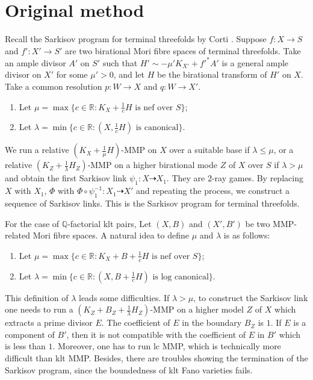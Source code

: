 \documentclass[11pt]{amsart}
\begin{document}
\section{Original method}
Recall the Sarkisov program for terminal threefolds by Corti \cite{cortiFactoringBirationalMaps}. Suppose $f: X\to S$ and $f':X'\to S'$ are two birational Mori fibre spaces of terminal threefolds.
Take an ample divisor $A'$ on $S'$ such that $H'\sim -\mu'K_{X'}+f'^*A'$  is a general ample divisor on $X'$ for some $\mu'>0$, and let $H$ be the birational transform of $H'$ on $X$. Take a common resolution $p: W\to X$ and $q:W \to X'$. 
\begin{enumerate}
  \item Let $\mu= \max \{c \in \mathbb{R} : K_{X}+\frac{1}{c}H \text{ is nef over } S \}$;
  \item Let $\lambda = \min \{c\in \mathbb{R}: (X,\frac{1}{c}H) \text{ is canonical}  \}$.
\end{enumerate}
We run a relative $(K_X+\frac{1}{\mu}H)$-MMP on $X$ over a suitable base  if $\lambda \leqslant \mu$, or a relative $(K_Z+\frac{1}{\lambda}H_Z)$-MMP on a higher birational mode $Z$ of $X$ over $S$ if $\lambda > \mu$ and obtain the first Sarkisov link $\psi_1: X\dashrightarrow  X_{1}$. They are $2$-ray games. By replacing $X$ with $X_{1}$, $\Phi$ with $\Phi\circ\psi_1^{-1}: X_1\dashrightarrow X'$ and repeating the process, we construct a sequence of Sarkisov links. This is the Sarkisov program for terminal threefolds.




For the case of $\mathbb{Q}$-factorial klt pairs, Let $(X,B)$ and $(X',B')$ be two MMP-related Mori fibre spaces. A natural idea to define $\mu$ and $\lambda$ is as follows:
\begin{enumerate}
  \item Let $\mu= \max \{c \in \mathbb{R} : K_{X}+B+\frac{1}{c}H \text{ is nef over } S \}$;
  \item Let $\lambda = \min \{c\in \mathbb{R}: (X,B+\frac{1}{c}H) \text{ is log canonical}  \}$.
\end{enumerate}

This definition of $\lambda$ leads some difficulties. If $\lambda > \mu$, to construct the Sarkisov link one needs to run a $(K_Z+B_Z+\frac{1}{\lambda}H_Z)$-MMP on a higher model $Z$ of $X$ which extracts a prime divisor $E$. The coefficient of $E$ in the boundary $B_Z$ is $1$. If $E$ is a component of $B'$, then it is not compatible with the coefficient of $E$ in $B'$ which is less than $1$. Moreover, one has to run lc MMP, which is technically  more difficult than klt MMP. Besides, there are troubles showing the termination of the Sarkisov program, since the boundedness of klt Fano varieties fails.
\end{document}
